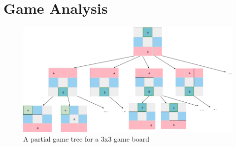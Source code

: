 \chapter{Game Analysis}

\begin{figure}[h]
    \centering
    \includegraphics[scale=0.45]{../img/GameBoard/game_tree.png}
    \caption{A partial game tree for a 3x3 game board}
    \label{fig:GameTree}
\end{figure}